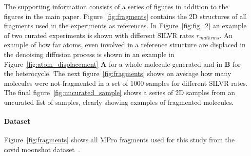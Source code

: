 \documentclass[journal=jacsat,manuscript=article]{achemso}
\begin{document}



\newpage 
\begin{suppinfo}

The supporting information consists of a series of figures in addition to the figures in the main paper. Figure~\ref{fig:fragments} contains the 2D structures of all fragments used in the experiments as references. In Figure~\ref{fig:fig_2} an example of two curated experiments is shown with different SILVR rates $r_{mathrm{s}}$. An example of how far atoms, even involved in a reference structure are displaced in the denoising diffusion process is shown in an example in Figure~\ref{fig:atom_displacement} \textbf{A} for a whole molecule generated and in \textbf{B} for the heterocycle. The next figure~\ref{fig:fragments} shows on average how many molecules were not-fragmented in a set of 1000 samples for different SILVR rates. The final figure~\ref{fig:uncurated_sample} shows a series of 2D samples from an uncurated list of samples, clearly showing examples of fragmented molecules.  
\paragraph{Dataset}
Figure~\ref{fig:fragments} shows all MPro fragments used for this study from the covid moonshot dataset~\cite{consortium2021open,consortium2023open}.


\end{suppinfo}
\end{document}
